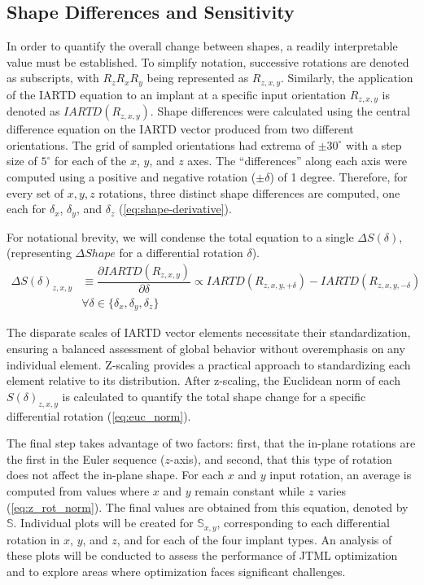 \subsection{Shape Differences and Sensitivity}
In order to quantify the overall change between shapes, a readily interpretable value must be established.
To simplify notation, successive rotations are denoted as subscripts, with $R_{z}R_{x}R_{y}$ being represented as $R_{z,x,y}$. Similarly, the application of the IARTD equation to an implant at a specific input orientation $R_{z,x,y}$ is denoted as $IARTD(R_{z,x,y})$.
Shape differences were calculated using the central difference equation on the IARTD vector produced from two different orientations.
The grid of sampled orientations had extrema of $\pm 30^{\circ}$ with a step size of $5^{\circ}$ for each of the $x$, $y$, and $z$ axes.
The ``differences'' along each axis were computed using a positive and negative rotation ($\pm \delta $) of 1 degree.
Therefore, for every set of $x,y,z$ rotations, three distinct shape differences are computed, one each for $\delta_{x}$, $\delta_{y}$, and $\delta_{z}$ (\cref{eq:shape-derivative}).

For notational brevity, we will condense the total equation to a single $\Delta S(\delta)$, (representing $\Delta Shape$ for a differential rotation $\delta$).
\begin{equation}
	\label{eq:shape-derivative}
	\begin{split}
		\Delta S(\delta)_{z,x,y} & \equiv \dfrac{ \partial IARTD(R_{z,x,y}) }{\partial \delta} \propto IARTD(R_{z,x,y,+\delta}) - IARTD(R_{z,x,y,-\delta}) \\
		                         & \forall \delta \in \{\delta_{x},\delta_{y},\delta_{z}\}
	\end{split}
\end{equation}

The disparate scales of IARTD vector elements necessitate their standardization, ensuring a balanced assessment of global behavior without overemphasis on any individual element.
Z-scaling provides a practical approach to standardizing each element relative to its distribution.
After z-scaling, the Euclidean norm of each $S(\delta)_{z,x,y}$ is calculated to quantify the total shape change for a specific differential rotation (\cref{eq:euc_norm}).

The final step takes advantage of two factors: first, that the in-plane rotations are the first in the Euler sequence ($z$-axis), and second, that this type of rotation does not affect the in-plane shape.
For each $x$ and $y$ input rotation, an average is computed from values where $x$ and $y$ remain constant while $z$ varies (\cref{eq:z_rot_norm}). The final values are obtained from this equation, denoted by $\mathbb{S}$.
Individual plots will be created for $\mathbb{S}_{x,y}$, corresponding to each differential rotation in $x$, $y$, and $z$, and for each of the four implant types.
An analysis of these plots will be conducted to assess the performance of JTML optimization and to explore areas where optimization faces significant challenges.

